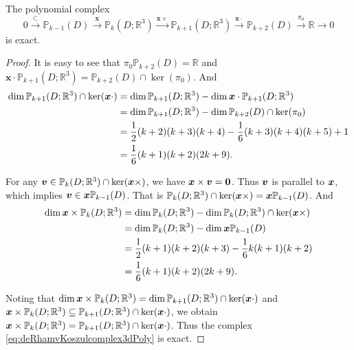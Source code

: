 %



\begin{lemma}\label{lem:Koszul}
The polynomial complex
\begin{equation}\label{eq:deRhamvKoszulcomplex3dPoly}
0\xrightarrow{\subset}\mathbb P_{k-1}(D) \xrightarrow{\boldsymbol x} \mathbb P_k(D; \mathbb R^3) \xrightarrow{\boldsymbol x\times} \mathbb P_{k+1}(D; \mathbb R^3)\xrightarrow{\boldsymbol x\cdot} \mathbb P_{k+2}(D)\xrightarrow{\pi_{0}}\mathbb {R}\xrightarrow{}0
\end{equation}
is exact.
\end{lemma}
\begin{proof}
It is easy to see that $\pi_0\mathbb P_{k+2}(D)=\mathbb R$ and $\boldsymbol x\cdot\mathbb P_{k+1}(D; \mathbb R^3)=\mathbb P_{k+2}(D)\cap\ker(\pi_0)$. And
\begin{align*}
\dim\mathbb P_{k+1}(D; \mathbb R^3)\cap\ker(\boldsymbol x\cdot)&=\dim\mathbb P_{k+1}(D; \mathbb R^3)-\dim\boldsymbol x\cdot\mathbb P_{k+1}(D; \mathbb R^3) \\
&=\dim\mathbb P_{k+1}(D; \mathbb R^3)-\dim\mathbb P_{k+2}(D)\cap\ker(\pi_0) \\
&=\frac{1}{2}(k+2)(k+3)(k+4) - \frac{1}{6}(k+3)(k+4)(k+5) + 1 \\
&=\frac{1}{6}(k+1)(k+2)(2k+9).
\end{align*}

For any $\boldsymbol v\in\mathbb P_{k}(D; \mathbb R^3)\cap\ker(\boldsymbol x\times)$, we have $\boldsymbol x\times\boldsymbol v=\boldsymbol0$. Thus $\boldsymbol v$ is parallel to $\boldsymbol x$, which implies $\boldsymbol v\in\boldsymbol x\mathbb P_{k-1}(D)$. That is $\mathbb P_{k}(D; \mathbb R^3)\cap\ker(\boldsymbol x\times)=\boldsymbol x\mathbb P_{k-1}(D)$. And
\begin{align*}
\dim\boldsymbol x\times\mathbb P_{k}(D; \mathbb R^3)&=\dim\mathbb P_{k}(D; \mathbb R^3)-\dim\mathbb P_{k}(D; \mathbb R^3)\cap\ker(\boldsymbol x\times) \\
&=\dim\mathbb P_{k}(D; \mathbb R^3)-\dim\boldsymbol x\mathbb P_{k-1}(D) \\
&=\frac{1}{2}(k+1)(k+2)(k+3) - \frac{1}{6}k(k+1)(k+2) \\
&=\frac{1}{6}(k+1)(k+2)(2k+9).
\end{align*}

Noting that $\dim\boldsymbol x\times\mathbb P_{k}(D; \mathbb R^3)=\dim\mathbb P_{k+1}(D; \mathbb R^3)\cap\ker(\boldsymbol x\cdot)$ and $\boldsymbol x\times\mathbb P_{k}(D; \mathbb R^3)\subseteq\mathbb P_{k+1}(D; \mathbb R^3)\cap\ker(\boldsymbol x\cdot)$, we obtain $\boldsymbol x\times\mathbb P_{k}(D; \mathbb R^3)=\mathbb P_{k+1}(D; \mathbb R^3)\cap\ker(\boldsymbol x\cdot)$.
Thus the complex \eqref{eq:deRhamvKoszulcomplex3dPoly} is exact.
\end{proof}

